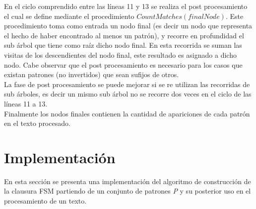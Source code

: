 En el ciclo comprendido entre las líneas 11 y 13 se realiza el post procesamiento el cual se define mediante el procedimiento $CountMatches(finalNode)$. Este procedimiento toma como entrada un nodo final (es decir un nodo que representa el hecho de haber encontrado al menos un patrón), y recorre en profundidad el sub árbol que tiene como raíz dicho nodo final. En esta recorrida se suman las visitas de los descendientes del nodo final, este resultado es asignado a dicho nodo. 
Cabe observar que el post procesamiento es necesario para los casos que existan patrones (no invertidos) que sean sufijos de otros.\\
La fase de post procesamiento se puede mejorar si se re utilizan las recorridas de sub árboles, es decir un mismo sub árbol no se recorre dos veces en el ciclo de las líneas 11 a 13.\\
Finalmente los nodos finales contienen la cantidad de apariciones de cada patrón en el texto procesado. 
\section{Implementación}
\label{sec:Implementacion}
En esta sección se presenta una implementación del algoritmo de construcción de la clausura FSM partiendo de un conjunto de patrones {\it P} y su posterior uso en el procesamiento de un texto.\\
